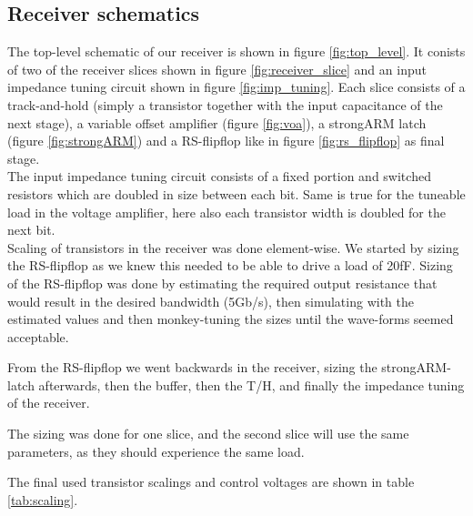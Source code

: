 \subsection{Receiver schematics}
\label{sec:rx_schematics}

The top-level schematic of our receiver is shown in figure \ref{fig:top_level}. It conists of two of the receiver slices shown in figure \ref{fig:receiver_slice} and an input impedance tuning circuit shown in figure \ref{fig:imp_tuning}. Each slice consists of a track-and-hold (simply a transistor together with the input capacitance of the next stage), a variable offset amplifier (figure \ref{fig:voa}), a strongARM latch (figure \ref{fig:strongARM}) and a RS-flipflop like in figure \ref{fig:rs_flipflop} as final stage.\\
The input impedance tuning circuit consists of a fixed portion and switched resistors which are doubled in size between each bit. Same is true for the tuneable load in the voltage amplifier, here also each transistor width is doubled for the next bit.\\

Scaling of transistors in the receiver was done element-wise. We started by sizing the RS-flipflop as we knew this needed to be able to drive a load of 20fF. Sizing of the RS-flipflop was done by estimating the required output resistance that would result in the desired bandwidth (5Gb/s), then simulating with the estimated values and then monkey-tuning the sizes until the wave-forms seemed acceptable.

From the RS-flipflop we went backwards in the receiver, sizing the strongARM-latch afterwards, then the buffer, then the T/H, and finally the impedance tuning of the receiver.

The sizing was done for one slice, and the second slice will use the same parameters, as they should experience the same load.

The final used transistor scalings and control voltages are shown in table \ref{tab:scaling}.

